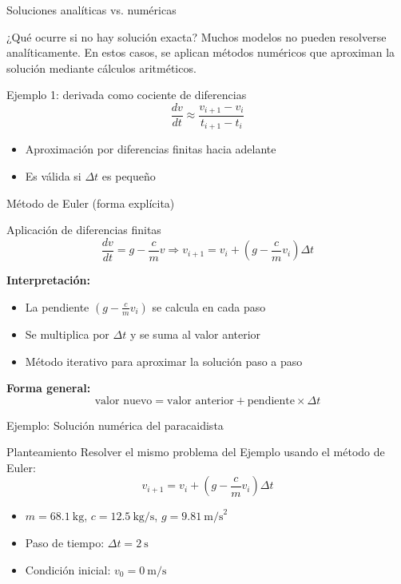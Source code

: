 \documentclass[main.tex]{subfiles}
\begin{document}
\begin{frame}[c]{Soluciones analíticas vs. numéricas}
\begin{block}{¿Qué ocurre si no hay solución exacta?}
\vspace{0.2cm}
Muchos modelos no pueden resolverse analíticamente. En estos casos, se aplican métodos numéricos que aproximan la solución mediante cálculos aritméticos.
\end{block}

\begin{block}{Ejemplo 1: derivada como cociente de diferencias}
\vspace{0.2cm}
\[
\frac{dv}{dt} \approx \frac{v_{i+1} - v_i}{t_{i+1} - t_i}
\]
\begin{itemize}
  \item Aproximación por diferencias finitas hacia adelante
  \item Es válida si \(\Delta t\) es pequeño
\end{itemize}
\end{block}
\end{frame}

\begin{frame}[c]{Método de Euler (forma explícita)}
\begin{block}{Aplicación de diferencias finitas}
\[
\frac{dv}{dt} = g - \frac{c}{m}v \Rightarrow
v_{i+1} = v_i + \left(g - \frac{c}{m}v_i\right)\Delta t
\]
\end{block}

\textbf{Interpretación:}
\begin{itemize}
  \item La pendiente \((g - \frac{c}{m}v_i)\) se calcula en cada paso
  \item Se multiplica por \(\Delta t\) y se suma al valor anterior
  \item Método iterativo para aproximar la solución paso a paso
\end{itemize}

\textbf{Forma general:}
\[
\text{valor nuevo} = \text{valor anterior} + \text{pendiente} \times \Delta t
\]
\end{frame}
\begin{frame}[c]{Ejemplo: Solución numérica del paracaidista}
\begin{block}{Planteamiento}
\vspace{0.2cm}
Resolver el mismo problema del Ejemplo  usando el método de Euler:
\[
v_{i+1} = v_i + \left(g - \frac{c}{m}v_i\right)\Delta t
\]
\begin{itemize}
  \item \( m = 68.1~\text{kg} \), \( c = 12.5~\text{kg/s} \), \( g = 9.81~\text{m/s}^2 \)
  \item Paso de tiempo: \( \Delta t = 2~\text{s} \)
  \item Condición inicial: \( v_0 = 0~\text{m/s} \)
\end{itemize}
\end{block}
\end{frame}
\end{document}
